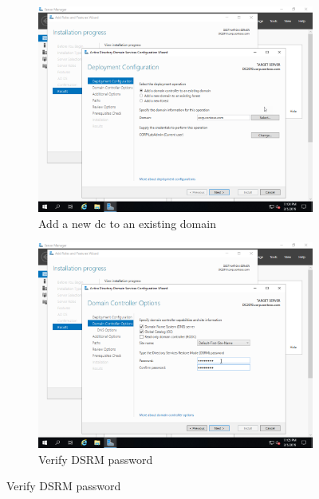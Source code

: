 \begin{figure}[!htb]\ContinuedFloat
	\begin{subfigure}{0.5\textwidth}
		\captionsetup{width=0.8\linewidth}
		\includegraphics[width=0.9\linewidth]{img/Methodologie/Migration19.png}
		\centering
		\caption{Add a new \acrshort{dc} to an existing domain}
	\end{subfigure}
	\begin{subfigure}{0.5\textwidth}
		\captionsetup{width=0.8\linewidth}
		\includegraphics[width=0.9\linewidth]{img/Methodologie/Migration20.png} 
		\centering
		\caption{Verify DSRM password}
	\end{subfigure}
\end{figure}
